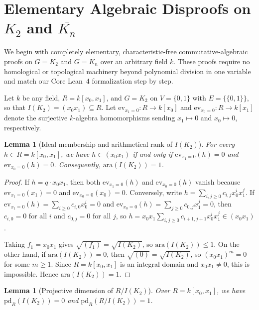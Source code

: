 \documentclass[11pt,a4paper]{amsart}
\theoremstyle{plain}
\newtheorem{lemma}[theorem]{Lemma}
\theoremstyle{definition}
\newcommand{\ara}{\mathrm{ara}}
\newcommand{\pd}{\mathrm{pd}}
\begin{document}
\section{Elementary Algebraic Disproofs on \texorpdfstring{$K_2$}{K2} and \texorpdfstring{$\overline{K_n}$}{Kn-bar}}\label{sec:elementary}

We begin with completely elementary, characteristic-free commutative-algebraic proofs on $G = K_2$ and $G = \overline{K_n}$ over an arbitrary field $k$. These proofs require no homological or topological machinery beyond polynomial division in one variable and match our Core Lean~4 formalization step by step.

Let $k$ be any field, $R = k[x_0, x_1]$, and $G = K_2$ on $V = \{0, 1\}$ with $E = \{\{0, 1\}\}$, so that $I(K_2) = (x_0 x_1) \subseteq R$. Let $\mathrm{ev}_{x_1=0} : R \to k[x_0]$ and $\mathrm{ev}_{x_0=0} : R \to k[x_1]$ denote the surjective $k$-algebra homomorphisms sending $x_1 \mapsto 0$ and $x_0 \mapsto 0$, respectively.

\begin{lemma}[Ideal membership and arithmetical rank of $I(K_2)$]\label{lem:k2-ara}
For every $h \in R = k[x_0, x_1]$, we have $h \in (x_0 x_1)$ if and only if $\mathrm{ev}_{x_1=0}(h) = 0$ and $\mathrm{ev}_{x_0=0}(h) = 0$. Consequently, $\ara(I(K_2)) = 1$.
\end{lemma}

\begin{proof}
If $h = q \cdot x_0 x_1$, then both $\mathrm{ev}_{x_1=0}(h)$ and $\mathrm{ev}_{x_0=0}(h)$ vanish because $\mathrm{ev}_{x_1=0}(x_1) = 0$ and $\mathrm{ev}_{x_0=0}(x_0) = 0$. Conversely, write $h = \sum_{i,j \ge 0} c_{i,j} x_0^i x_1^j$. If $\mathrm{ev}_{x_1=0}(h) = \sum_{i \ge 0} c_{i,0} x_0^i = 0$ and $\mathrm{ev}_{x_0=0}(h) = \sum_{j \ge 0} c_{0,j} x_1^j = 0$, then $c_{i,0} = 0$ for all $i$ and $c_{0,j} = 0$ for all $j$, so $h = x_0 x_1 \sum_{i,j \ge 0} c_{i+1,j+1} x_0^i x_1^j \in (x_0 x_1)$.

Taking $f_1 = x_0 x_1$ gives $\sqrt{(f_1)} = \sqrt{I(K_2)}$, so $\ara(I(K_2)) \le 1$. On the other hand, if $\ara(I(K_2)) = 0$, then $\sqrt{(0)} = \sqrt{I(K_2)}$, so $(x_0 x_1)^m = 0$ for some $m \ge 1$. Since $R = k[x_0, x_1]$ is an integral domain and $x_0 x_1 \neq 0$, this is impossible. Hence $\ara(I(K_2)) = 1$.
\end{proof}

\begin{lemma}[Projective dimension of $R/I(K_2)$]\label{lem:k2-pd}
Over $R = k[x_0, x_1]$, we have $\pd_R(I(K_2)) = 0$ and $\pd_R(R/I(K_2)) = 1$.
\end{lemma}
\end{document}
